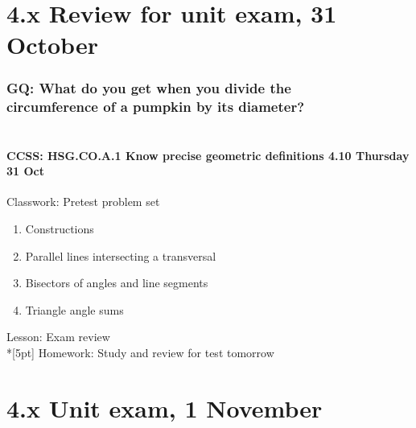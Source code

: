 \documentclass{beamer}
\begin{document}
\section{4.x Review for unit exam, 31 October}
\frame
{
  \frametitle{GQ: What do you get when you divide the \\ \hspace{1cm} circumference of a pumpkin by its diameter?}
  \framesubtitle{\\ CCSS: HSG.CO.A.1 Know precise geometric definitions \hfill \alert{4.10 Thursday 31 Oct}}

  \begin{block}{Classwork: Pretest problem set}
  \begin{enumerate}
    \item Constructions
    \item Parallel lines intersecting a transversal
    \item Bisectors of angles and line segments
    \item Triangle angle sums
  \end{enumerate}
  \end{block}
  Lesson: Exam review \\*[5pt]
  Homework: Study and review for \alert{test tomorrow}
}

\section{4.x Unit exam, 1 November}
\end{document}
